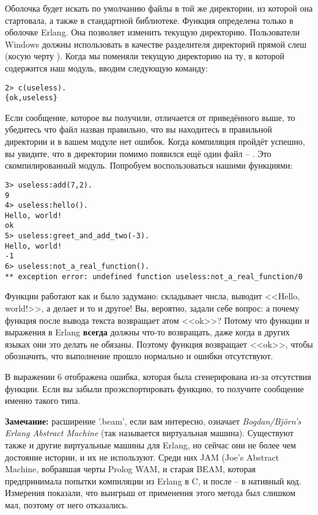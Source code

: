 Оболочка будет искать по умолчанию файлы в той же директории, из которой она стартовала, а также в стандартной библиотеке.
Функция  определена только в оболочке Erlang.
Она позволяет изменить текущую директорию.
Пользователи Windows должны использовать в качестве разделителя директорий прямой слеш (косую черту \ops{\//}).
Когда мы поменяли текущую директорию на ту, в которой содержится наш модуль, вводим следующую команду:
\begin{lstlisting}[style=erlang]
2> c(useless).
{ok,useless}
\end{lstlisting}

Если сообщение, которое вы получили, отличается от приведённого выше, то убедитесь что файл назван правильно, что вы находитесь в правильной директории и в вашем модуле нет ошибок.
Когда компиляция пройдёт успешно, вы увидите, что в директории помимо  появился ещё один файл \--- .
Это скомпилированный модуль.
Попробуем воспользоваться нашими функциями:
\begin{lstlisting}[style=erlang]
3> useless:add(7,2).
9
4> useless:hello().
Hello, world!
ok
5> useless:greet_and_add_two(-3).
Hello, world!
-1
6> useless:not_a_real_function().
** exception error: undefined function useless:not_a_real_function/0
\end{lstlisting}

Функции работают как и было задумано:  складывает числа,  выводит <<Hello, world!>>, а  делает и то и другое!
Вы, вероятно, задали себе вопрос: а почему функция  после вывода текста возвращает атом <<ok>>?
Потому что функции и выражения в Erlang \textbf{всегда} должны что\--то возвращать, даже когда в других языках они это делать не обязаны.
Поэтому функция  возвращает <<ok>>, чтобы обозначить, что выполнение прошло нормально и ошибки отсутствуют.

В выражении 6 отображена ошибка, которая была сгенерирована из\--за отсутствия функции.
Если вы забыли проэкспортировать функцию, то получите сообщение именно такого типа.\\ 
\colorbox{lgray}
{
    \begin{minipage}{1\linewidth}
        \textbf{Замечание:} расширение '.beam', если вам интересно, означает \emph{Bogdan/Björn's Erlang Abstract Machine} (так называется виртуальная машина).
        Существуют также и другие виртуальные машины для Erlang, но сейчас они не более чем достояние истории, и их не используют.
        Среди них JAM (Joe's Abstract Machine, вобравшая черты Prolog WAM, и старая BEAM, которая предпринимала попытки компиляции из Erlang в C, и после \--- в нативный код.
        Измерения показали, что выигрыш от применения этого метода был слишком мал, поэтому от него отказались.
    \end{minipage}
}

